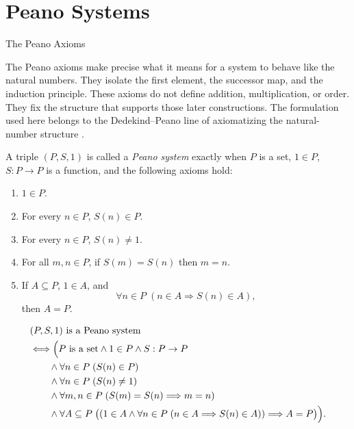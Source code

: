 \section{Peano Systems}

\begin{topicbox}{The Peano Axioms}
\begin{exposition}
The Peano axioms make precise what it means for a system to behave like
the natural numbers. They isolate the first element, the successor map,
and the induction principle. These axioms do not define addition,
multiplication, or order. They fix the structure that supports those
later constructions. The formulation used here belongs to the
Dedekind--Peano line of axiomatizing the natural-number structure
\citep{dedekind1901essays,PeanoArithmeticesPrincipia1889}.
\end{exposition}

\begin{tcolorbox}[colback=defbox, colframe=defborder, arc=2pt,
  left=6pt, right=6pt, top=4pt, bottom=4pt,
  title={\small\textbf{Definition (Peano System)}},
  fonttitle=\small\bfseries]
\begin{definition}
\label{def:peano-system}
A triple $(P,S,1)$ is called a \emph{Peano system} exactly when $P$ is a set,
$1 \in P$, $S : P \to P$ is a function, and the following axioms hold:
\begin{enumerate}
  \item[\textbf{P1.}] $1 \in P$.
  \item[\textbf{P2.}] For every $n \in P$, $S(n) \in P$.
  \item[\textbf{P3.}] For every $n \in P$, $S(n) \neq 1$.
  \item[\textbf{P4.}] For all $m,n \in P$, if $S(m)=S(n)$ then $m=n$.
  \item[\textbf{P5.}] If $A \subseteq P$, $1 \in A$, and
  \[
    \forall n \in P\;(n \in A \Longrightarrow S(n) \in A),
  \]
  then $A=P$.
\end{enumerate}
\end{definition}
\end{tcolorbox}

\begin{remark*}
\[
\begin{aligned}
&(P,S,1) \text{ is a Peano system}\\
&\Longleftrightarrow
\Bigl(P \text{ is a set} \land 1 \in P \land S : P \to P \\
&\qquad \land \forall n \in P\;(S(n) \in P) \\
&\qquad \land \forall n \in P\;(S(n) \neq 1) \\
&\qquad \land \forall m,n \in P\;(S(m)=S(n) \Longrightarrow m=n) \\
&\qquad \land \forall A \subseteq P\;
\bigl((1 \in A \land
\forall n \in P\;(n \in A \Longrightarrow S(n) \in A))
\Longrightarrow A=P\bigr)\Bigr).
\end{aligned}
\]
\end{remark*}


\end{topicbox}
